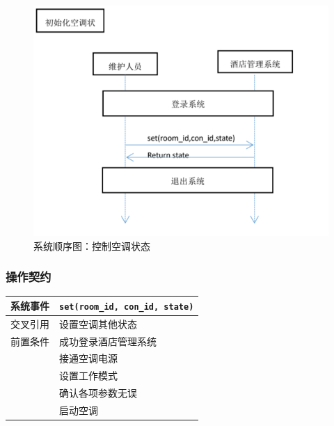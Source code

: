 \documentclass[black,normal,cn]{elegantnote}
\newcommand{\code}[1]{\colorbox{light-gray}{\texttt{#1}}}
\begin{document}
\begin{figure}[H]
    \centering
    \includegraphics[width=.8\textwidth]{fig/260006.png}
    \caption{系统顺序图：控制空调状态}
    \label{fig:260003}
\end{figure}

\subsubsection{操作契约}

\begin{center}
    \begin{tabular}{|>{\centering}m{}|m{}|}
        \hline
        系统事件                  & \multicolumn{1}{l|}{\code{set(room\_id, con\_id, state)}} \\
        \hline
        交叉引用                  & 设置空调其他状态                                          \\
        \hline
        前置条件                  & 成功登录酒店管理系统                                      \\
        \hline
        \multirow{4}{*}{后置条件} & 接通空调电源                                              \\
        \cline{2-2}
                                  & 设置工作模式                                              \\
        \cline{2-2}
                                  & 确认各项参数无误                                          \\
        \cline{2-2}
                                  & 启动空调                                                  \\
        \hline
    \end{tabular}
\end{center}
\end{document}
